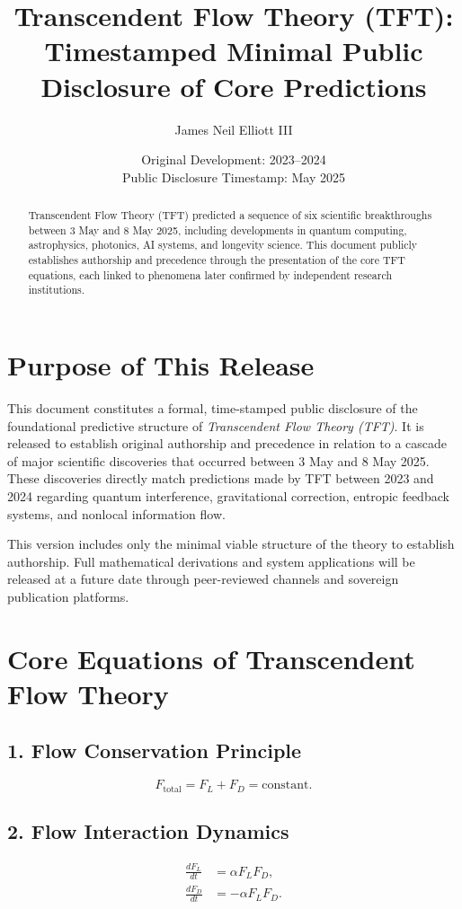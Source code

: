 \documentclass[11pt]{article}
\title{\textbf{Transcendent Flow Theory (TFT):\\ Timestamped Minimal Public Disclosure of Core Predictions}}
\author{James Neil Elliott III}
\date{Original Development: 2023--2024\\Public Disclosure Timestamp: May 2025}
\begin{document}
\maketitle

\begin{abstract}
Transcendent Flow Theory (TFT) predicted a sequence of six scientific breakthroughs between 3 May and 8 May 2025, including developments in quantum computing, astrophysics, photonics, AI systems, and longevity science. This document publicly establishes authorship and precedence through the presentation of the core TFT equations, each linked to phenomena later confirmed by independent research institutions.
\end{abstract}

\section*{Purpose of This Release}
This document constitutes a formal, time-stamped public disclosure of the foundational predictive structure of \textit{Transcendent Flow Theory (TFT)}. It is released to establish original authorship and precedence in relation to a cascade of major scientific discoveries that occurred between 3 May and 8 May 2025. These discoveries directly match predictions made by TFT between 2023 and 2024 regarding quantum interference, gravitational correction, entropic feedback systems, and nonlocal information flow.

This version includes only the minimal viable structure of the theory to establish authorship. Full mathematical derivations and system applications will be released at a future date through peer-reviewed channels and sovereign publication platforms.

\section*{Core Equations of Transcendent Flow Theory}

\subsection*{1. Flow Conservation Principle}
\begin{equation}
F_{\text{total}} = F_L + F_D = \text{constant}.
\end{equation}

\subsection*{2. Flow Interaction Dynamics}
\begin{align}
\frac{dF_L}{dt} &= \alpha F_L F_D, \\
\frac{dF_D}{dt} &= -\alpha F_L F_D.
\end{align}
\end{document}
